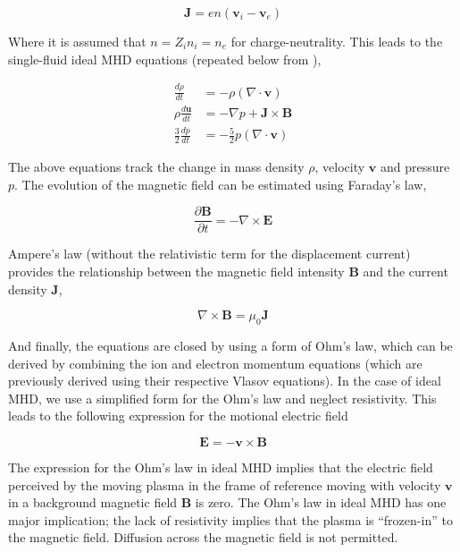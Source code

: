 \begin{equation}
    \mathbf{J} = en \left( \mathbf{v}_i - \mathbf{v}_e\right)
\end{equation}
 
Where it is assumed that $n = Z_i n_i = n_e$ for charge-neutrality. This leads to the single-fluid ideal MHD equations (repeated below from ),

\begin{align}
    \frac{d\rho}{dt} &= -\rho \left( \nabla \cdot \mathbf{v} \right)\\
    \rho \frac{d\mathbf{u}}{dt} & = -\nabla p + \mathbf{J} \times \mathbf{B} \\
    \frac{3}{2}\frac{d p}{d t}  & = - \frac{5}{2} p \left(\nabla \cdot \mathbf{v} \right)
\end{align}

The above equations track the change in mass density $\rho$, velocity $\mathbf{v}$ and pressure $p$. The evolution of the magnetic field can be estimated using Faraday's law,

\begin{equation}
    \frac{\partial \mathbf{B}}{\partial t} = - \nabla \times \mathbf{E}    
\end{equation}

Ampere's law (without the relativistic term for the displacement current) provides the relationship between the magnetic field intensity $\mathbf{B}$ and the current density $\mathbf{J}$,

\begin{equation}
    \nabla \times \mathbf{B} = \mu_0 \mathbf{J}    
\end{equation}

And finally, the equations are closed by using a form of Ohm's law, which can be derived by combining the ion and electron momentum equations (which are previously derived using their respective Vlasov equations). In the case of ideal MHD, we use a simplified form for the Ohm's law and neglect resistivity. This leads to the following expression for the motional electric field 

\begin{equation}
    \mathbf{E} = -\mathbf{v} \times \mathbf{B}
\end{equation}

The expression for the Ohm's law in ideal MHD implies that the electric field perceived by the moving plasma in the frame of reference moving with velocity $\mathbf{v}$ in a background magnetic field $\mathbf{B}$ is zero. The Ohm's law in ideal MHD has one major implication; the lack of resistivity implies that the plasma is ``frozen-in'' to the magnetic field. Diffusion across the magnetic field is not permitted. 

